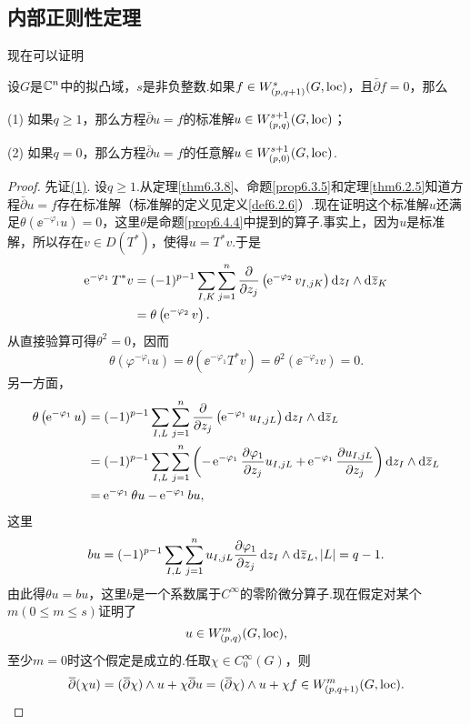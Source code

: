 \subsection{内部正则性定理}
现在可以证明
\begin{theorem}\label{thm6.4.5}
	设$G$是$\mathbb C^n$中的拟凸域，$s$是非负整数.如果$f\in W_{(p,q+1)}^s(G,\operatorname{loc})$，且$\bar{\partial}f=0$，那么
	
	(1)\hypertarget{6.4.5}{}
	如果$q\ge1$，那么方程$\bar{\partial}u=f$的标准解$u\in W_{(p,q)}^{s+1}(G,\operatorname{loc})$；
	
	(2)\hypertarget{6.4.5}{}
	如果$q=0$，那么方程$\bar{\partial}u=f$的任意解$u\in W_{(p,0)}^{s+1}(G,\operatorname{loc})$.
\end{theorem}
\begin{proof}
	先证\hyperlink{6.4.5}{(1)}. 设$q\ge1$.从定理\ref{thm6.3.8}、命题\ref{prop6.3.5}和定理\ref{thm6.2.5}知道方程$\bar{\partial}u=f$存在标准解（标准解的定义见定义\ref{def6.2.6}）.现在证明这个标准解$u$还满足$\theta\left(\ee^{-\varphi_1}u\right)=0$，这里$\theta$是命题\ref{prop6.4.4}中提到的算子.事实上，因为$u$是标准解，所以存在$v\in D(T^\ast)$，使得$u=T^\ast v$.于是
	\begin{align*}
		\ee^{-\varphi_1} T^\ast v
		&=(-1)^{p-1}\sum_{I,K}\sum_{j=1}^{n}\pp{}{z_j}\left(\ee^{-\varphi_2}v_{I,jK}\right)\dz_I\wedge\dzz_K\\
		&=\theta\left(\ee^{-\varphi_2}v\right).
	\end{align*}
	从直接验算可得$\theta^2=0$，因而
	\[\theta\left(\varphi^{-\varphi_1}u\right)=\theta\left(\ee^{-\varphi_1}T^\ast v\right)=\theta^2\left(\ee^{-\varphi_2}v\right)=0.\]
	另一方面，
	\begin{align*}
		\theta\left(\ee^{-\varphi_1}u\right)
		&=(-1)^{p-1}\sum_{I,L}\sum_{j=1}^{n}\pp{}{z_j}\left(\ee^{-\varphi_1}u_{I,jL}\right)\dz_I\wedge\dzz_L\\
		&=(-1)^{p-1}\sum_{I,L}\sum_{j=1}^{n}\left(-\ee^{-\varphi_1}\pp{\varphi_1}{z_j}u_{I,jL}+\ee^{-\varphi_1}\pp{u_{I,jL}}{z_j}\right)\dz_I\wedge\dzz_L\\
		&=\ee^{-\varphi_1}\theta u-\ee^{-\varphi_1}bu,
	\end{align*}
	这里
	\[bu=(-1)^{p-1}\sum_{I,L}\sum_{j=1}^{n}u_{I,jL}\frac{\partial \varphi_1}{\partial z_j}\mathop{}\!\mathrm dz_I\wedge\mathop{}\!\mathrm d{}\mkern1mu\overline{\mkern-1muz}_L,|L|=q-1.\]
	由此得$\theta u=bu$，这里$b$是一个系数属于$C^\infty$的零阶微分算子.现在假定对某个$m(0\le m\le s)$证明了
	\[u\in W_{(p,q)}^m(G,\operatorname{loc}),\]
	至少$m=0$时这个假定是成立的.任取$\chi\in C_0^\infty(G)$，则
	\[{}\mkern1mu\overline{\mkern-1mu\partial}(\chi u)=({}\mkern1mu\overline{\mkern-1mu\partial}\chi)\wedge u+\chi{}\mkern1mu\overline{\mkern-1mu\partial}u=({}\mkern1mu\overline{\mkern-1mu\partial}\chi)\wedge u+\chi f\in W_{(p,q+1)}^m(G,\operatorname{loc}).\]

\end{proof}
